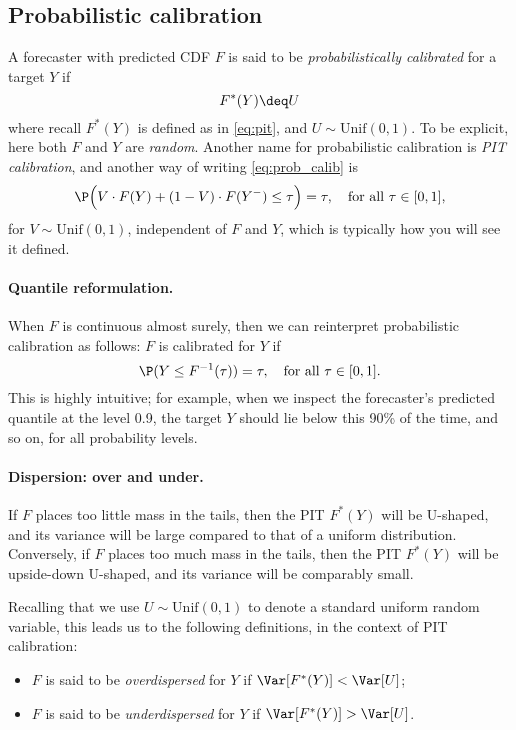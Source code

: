 \documentclass{article}
\begin{document}
\subsection{Probabilistic calibration}

A forecaster with predicted CDF $F$ is said to be \emph{probabilistically 
  calibrated} for a target $Y$ if 
\begin{equation}
\label{eq:prob_calib}
F^*(Y) \deq U
\end{equation}
where recall $F^*(Y)$ is defined as in \eqref{eq:pit}, and $U \sim 
\mathrm{Unif}(0,1)$. To be explicit, here both $F$ and $Y$ are
\emph{random}. Another name for probabilistic calibration is \emph{PIT
  calibration}, and another way of writing \eqref{eq:prob_calib} is  
\[
\P\Big( V \cdot F(Y) + (1-V) \cdot F(Y^-) \leq \tau \Big) = \tau, \quad \text{for all
  $\tau \in [0,1]$}, 
\]
for $V \sim \mathrm{Unif}(0,1)$, independent of $F$ and $Y$, which is typically
how you will see it defined. 

\paragraph{Quantile reformulation.}

When $F$ is continuous almost surely, then we can reinterpret probabilistic
calibration as follows: $F$ is calibrated for $Y$ if   
\[
\P(Y \leq F^{-1}(\tau)) = \tau, \quad \text{for all $\tau \in [0,1]$}.  
\]
This is highly intuitive; for example, when we inspect the forecaster's
predicted quantile at the level 0.9, the target $Y$ should lie below this 90\% 
of the time, and so on, for all probability levels.   

\paragraph{Dispersion: over and under.}

If $F$ places too little mass in the tails, then the PIT $F^*(Y)$ will be
U-shaped, and its variance will be large compared to that of a uniform
distribution. Conversely, if $F$ places too much mass in the tails, then the PIT
$F^*(Y)$ will be upside-down U-shaped, and its variance will be comparably
small.

Recalling that we use $U \sim \mathrm{Unif}(0,1)$ to denote a standard uniform
random variable, this leads us to the following definitions, in the context of
PIT calibration:    

\begin{itemize}
\item $F$ is said to be \emph{overdispersed} for $Y$ if $\Var[F^*(Y)] < \Var[U]$;
\item $F$ is said to be \emph{underdispersed} for $Y$ if $\Var[F^*(Y)] >
  \Var[U]$. 
\end{itemize}
\end{document}
